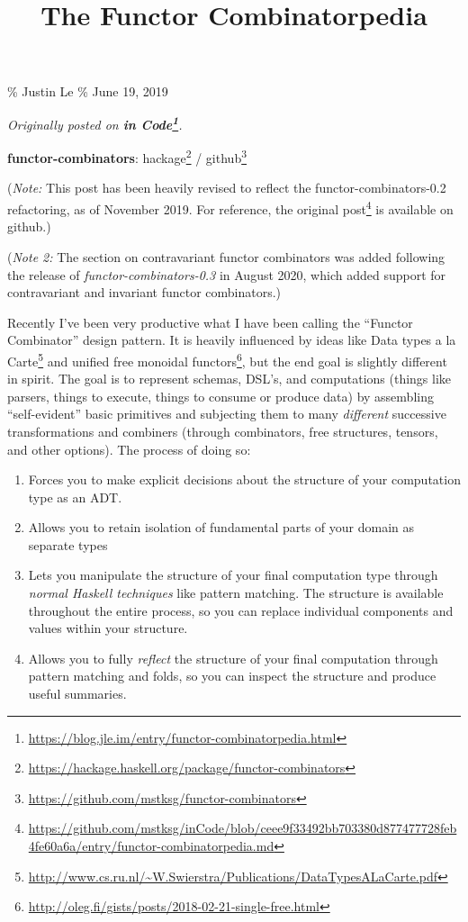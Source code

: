 \documentclass[]{article}
\title{The Functor Combinatorpedia}
\renewcommand{\href}[2]{#2\footnote{\url{#1}}}
\begin{document}
\maketitle

\% Justin Le \% June 19, 2019

\emph{Originally posted on
\textbf{\href{https://blog.jle.im/entry/functor-combinatorpedia.html}{in
Code}}.}

\textbf{functor-combinators}:
\href{https://hackage.haskell.org/package/functor-combinators}{hackage} /
\href{https://github.com/mstksg/functor-combinators}{github}

(\emph{Note:} This post has been heavily revised to reflect the
functor-combinators-0.2 refactoring, as of November 2019. For reference,
\href{https://github.com/mstksg/inCode/blob/ceee9f33492bb703380d877477728feb4fe60a6a/entry/functor-combinatorpedia.md}{the
original post} is available on github.)

(\emph{Note 2:} The section on contravariant functor combinators was added
following the release of \emph{functor-combinators-0.3} in August 2020, which
added support for contravariant and invariant functor combinators.)

Recently I've been very productive what I have been calling the ``Functor
Combinator'' design pattern. It is heavily influenced by ideas like
\href{http://www.cs.ru.nl/~W.Swierstra/Publications/DataTypesALaCarte.pdf}{Data
types a la Carte} and
\href{http://oleg.fi/gists/posts/2018-02-21-single-free.html}{unified free
monoidal functors}, but the end goal is slightly different in spirit. The goal
is to represent schemas, DSL's, and computations (things like parsers, things to
execute, things to consume or produce data) by assembling ``self-evident'' basic
primitives and subjecting them to many \emph{different} successive
transformations and combiners (through combinators, free structures, tensors,
and other options). The process of doing so:

\begin{enumerate}
\def\labelenumi{\arabic{enumi}.}
\tightlist
\item
  Forces you to make explicit decisions about the structure of your computation
  type as an ADT.
\item
  Allows you to retain isolation of fundamental parts of your domain as separate
  types
\item
  Lets you manipulate the structure of your final computation type through
  \emph{normal Haskell techniques} like pattern matching. The structure is
  available throughout the entire process, so you can replace individual
  components and values within your structure.
\item
  Allows you to fully \emph{reflect} the structure of your final computation
  through pattern matching and folds, so you can inspect the structure and
  produce useful summaries.
\end{enumerate}
\end{document}

